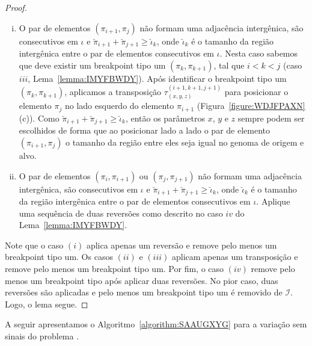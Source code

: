 \begin{proof}
\begin{enumerate}[i.]
  \item O par de elementos $(\pi_{i+1},\pi_{j})$ não formam uma adjacência intergênica, são consecutivos em $\iota$ e $\breve\pi_{i+1} + \breve\pi_{j+1} \ge \breve\iota_k$, onde $\breve\iota_k$ é o tamanho da região intergênica entre o par de elementos consecutivos em $\iota$. Nesta caso sabemos que deve existir um breakpoint tipo um $(\pi_k, \pi_{k+1})$, tal que $i < k < j$ (caso $iii$, Lema~\ref{lemma:IMYFBWDY}). Após identificar o breakpoint tipo um $(\pi_k, \pi_{k+1})$, aplicamos a transposição $\tau^{(i+1,k+1,j+1)}_{(x,y,z)}$ para posicionar o elemento $\pi_{j}$ no lado esquerdo do elemento $\pi_{i+1}$ (Figura~\ref{figure:WDJFPAXN}(c)). Como $\breve\pi_{i+1} + \breve\pi_{j+1} \ge \breve\iota_k$, então os parâmetros $x$, $y$ e $z$ sempre podem ser escolhidos de forma que ao posicionar lado a lado o par de elemento $(\pi_{i+1},\pi_{j})$ o tamanho da região entre eles seja igual no genoma de origem e alvo.
  \item O par de elementos $(\pi_{i},\pi_{i+1})$ ou $(\pi_{j},\pi_{j+1})$ não formam uma adjacência intergênica, são consecutivos em $\iota$ e $\breve\pi_{i+1} + \breve\pi_{j+1} \ge \breve\iota_k$, onde $\breve\iota_k$ é o tamanho da região intergênica entre o par de elementos consecutivos em $\iota$. Aplique uma sequência de duas reversões como descrito no caso $iv$ do Lema~\ref{lemma:IMYFBWDY}.
\end{enumerate}
Note que o caso $(i)$ aplica apenas um reversão e remove pelo menos um breakpoint tipo um. Os casos $(ii)$ e $(iii)$ aplicam apenas um transposição e remove pelo menos um breakpoint tipo um. Por fim, o caso $(iv)$ remove pelo menos um breakpoint tipo após aplicar duas reversões. No pior caso, duas reversões são aplicadas e pelo menos um breakpoint tipo um é removido de $\mathcal{I}$. Logo, o lema segue. 
\end{proof}



A seguir apresentamos o Algoritmo~\ref{algorithm:SAAUGXYG} para a variação sem sinais do problema \SbIRT{}.



